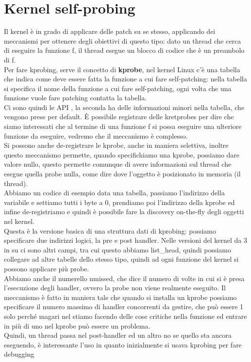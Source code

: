 \documentclass[12pt, oneside]{extbook}
\begin{document}
\section{Kernel self-probing}
Il kernel è in grado di applicare delle patch su se stesso, applicando dei meccanismi per ottenere degli obiettivi di questo tipo: dato un thread che cerca di eseguire la funzione f, il thread esegue un blocco di codice che è un preambolo di f.\\Per fare kprobing, serve il concetto di \textbf{kprobe}, nel kernel Linux c'è una tabella che indica come deve essere fatta la funzione a cui fare self-patching: nella tabella si specifica il nome della funzione a cui fare self-patching, ogni volta che una funzione vuole fare patching contatta la tabella.\\Ci sono quindi le API , la seconda ha delle informazioni minori nella tabella, che vengono prese per default. È possibile registrare delle kretprobes per dire che siamo interessati che al termine di una funzione f si possa eseguire una ulteriore funzione da eseguire, vedremo che il meccanismo è complesso.\\ Si possono anche de-registrare le kprobe, anche in maniera selettiva, inoltre questo meccanismo permette, quando specifichiamo una kprobe, possiamo dare valore nullo, questo permette comunque di avere informazioni sul thread che esegue quella probe nulla, come dire dove l'oggetto è posizionato in memoria (il thread).\\Abbiamo un codice di esempio
data una tabella, passiamo l'indirizzo della variabile e settiamo tutti i byte a 0, prendiamo poi l'indirizzo della kprobe ed infine de-registriamo e quindi è possibile fare la discovery on-the-fly degli oggetti nel kernel.\\Questa è la versione basica di una struttura dati di kprobing:
possiamo specificare due indirizzi logici, la pre e post handler. Nelle versioni del kernel da 3 in su ci sono altri campi, tra cui questo
abbiamo list\_head, quindi possiamo collegare ad altre tabelle dello stesso tipo, quindi ad ogni funzione del kernel si possono applicare più probe.\\Abbiamo anche il numerello nmissed, che dice il numero di volte in cui si è presa l'esecuzione degli handler, ovvero la probe non viene realmente eseguito. Il meccanismo è fatto in maniera tale che quando si installa un kprobe possiamo specificare il numero massimo di handler concorrenti da gestire, che può essere 1 solo perché magari nel stiamo facendo delle cose critiche nella funzione ed entrare in più di uno nel kprobe può essere un problema.\\Quindi, un thread passa nel post-handler ed un altro no se quello sta ancora eseguendo, è interessante l'uso in quanto inizialmente si usava kprobing per fare debugging
\end{document}
